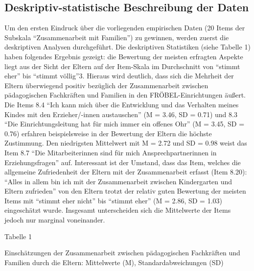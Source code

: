 \documentclass[12pt,a4paper]{article}
\begin{document}
\subsection{Deskriptiv-statistische Beschreibung der Daten}

Um den ersten Eindruck über die vorliegenden empirischen Daten (20 Items der Subskala "`Zusammenarbeit mit Familien"') zu gewinnen, werden zuerst die deskriptiven Analysen durchgeführt. Die deskriptiven Statistiken (siehe Tabelle 1) haben folgendes Ergebnis gezeigt: die Bewertung der meisten erfragten Aspekte liegt aus der Sicht der Eltern auf der Item-Skala im Durchschnitt von "`stimmt eher"' bis "`stimmt völlig"'3. Hieraus wird deutlich, dass sich die Mehrheit der Eltern überwiegend positiv bezüglich der Zusammenarbeit zwischen pädagogischen Fachkräften und Familien in den FRÖBEL-Einrichtungen äußert. Die Items 8.4 "`Ich kann mich über die Entwicklung und das Verhalten meines Kindes mit den Erzieher/-innen austauschen"' (M = 3.46, SD = 0.71) und 8.3 "`Die Einrichtungsleitung hat für mich immer ein offenes Ohr"' (M = 3.45, SD = 0.76) erfahren beispielsweise in der Bewertung der Eltern die höchste Zustimmung. Den niedrigsten Mittelwert mit M = 2.72 und SD = 0.98 weist das Item 8.7 "`Die Mitarbeiterinnen sind für mich Ansprechpartnerinnen in Erziehungsfragen"' auf. Interessant ist der Umstand, dass das Item, welches die allgemeine Zufriedenheit der Eltern mit der Zusammenarbeit erfasst (Item 8.20): "`Alles in allem bin ich mit der Zusammenarbeit zwischen Kindergarten und Eltern zufrieden"' von den Eltern trotzt der relativ guten Bewertung der meisten Items mit "`stimmt eher nicht"' bis "`stimmt eher"' (M = 2.86, SD = 1.03) eingeschätzt wurde. Insgesamt unterscheiden sich die Mittelwerte der Items jedoch nur marginal voneinander.

Tabelle 1

Einschätzungen der Zusammenarbeit zwischen pädagogischen Fachkräften und Familien durch die Eltern: Mittelwerte (M), Standardabweichungen (SD)
\end{document}
